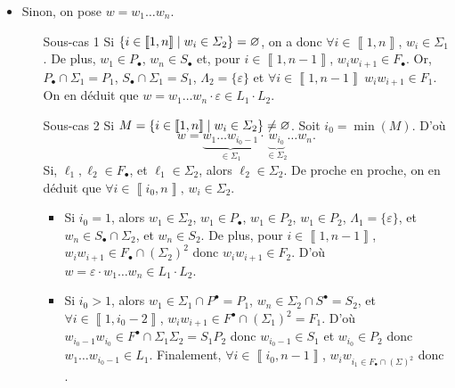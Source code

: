 \begin{prv}
\begin{itemize}
\begin{itemize}
				\item Sinon, on pose $w = w_1 \ldots w_n$.
					\begin{itemize}
						\item[{\sc Sous-cas 1}] Si $\{i \in \left\llbracket 1,n \right\rrbracket  \mid w_i \in \varSigma_2\} = \varnothing$, on a donc $\forall i \in \left\llbracket 1,n \right\rrbracket$, $w_i \in \Sigma_1$. De plus, $w_1 \in P_\bullet$, $w_n \in S_\bullet$\/ et, pour $i \in \left\llbracket 1,n-1 \right\rrbracket$, $w_i w_{i+1} \in F_\bullet$.
							Or, $P_\bullet \cap \Sigma_1 = P_1$, $S_\bullet \cap \Sigma_1 = S_1$, $\Lambda_2 = \{\varepsilon\}$\/ et $\forall i \in \left\llbracket 1,n-1 \right\rrbracket \ w_i w_{i+1} \in F_1$.
							On en déduit que $w = w_1\ldots w_n \cdot \varepsilon \in L_1 \cdot L_2$.
						\item[{\sc Sous-cas 2}] Si $M = \{i \in \left\llbracket 1, n \right\rrbracket  \mid w_i \in \varSigma_2\} \neq \varnothing$. Soit $i_0 = \min (M)$. D'où \[
							w = \underbrace{w_1 \ldots w_{i_0-1}}_{\in \Sigma_1} \cdot \underbrace{w_{i_0}}_{\in \Sigma_2} \ldots w_n
						.\]
						Si, $\ell_1,\ell_2 \in F_\bullet$, et $\ell_1 \in \Sigma_2$, alors $\ell_2 \in \Sigma_2$. De proche en proche, on en déduit que $\forall i \in \left\llbracket i_0,n \right\rrbracket,\,w_i \in \Sigma_2$.
						\begin{itemize}
							\item Si $i_0 = 1$, alors $w_1 \in \Sigma_2$, $w_1 \in P_\bullet$, $w_1 \in P_2$, $w_1 \in P_2$, $\Lambda_1 = \{\varepsilon\}$, et $w_n \in S_\bullet \cap \Sigma_2$, et $w_n \in S_2$.
								De plus, pour $i \in \left\llbracket 1,n-1 \right\rrbracket$, $w_iw_{i+1} \in F_\bullet \cap (\Sigma_2)^2$\/ donc $w_iw_{i+1} \in F_2$. D'où $w = \varepsilon \cdot w_1\ldots w_n \in L_1 \cdot L_2$.
							\item Si $i_0 > 1$, alors $w_1 \in \Sigma_1 \cap P^\bullet = P_1$, $w_n \in \Sigma_2 \cap S^\bullet = S_2$, et $\forall i \in \left\llbracket 1,i_0-2 \right\rrbracket$, $w_i w_{i+1} \in F^\bullet \cap (\Sigma_1)^2 = F_1$.
								D'où $w_{i_0 - 1} w_{i_0} \in F^\bullet \cap \Sigma_1 \Sigma_2 = S_1 P_2$\/ donc $w_{i_0 - 1} \in S_1$\/ et $w_{i_0} \in P_2$\/ donc $w_1 \ldots w_{i_0 - 1} \in L_1$. Finalement, $\forall i \in \left\llbracket i_0,n-1 \right\rrbracket$, $w_i w_{i_1 \in F_\bullet \cap (\Sigma)^2}$\/ donc .
						\end{itemize}
					\end{itemize}
			\end{itemize}
	\end{itemize}
\end{prv}


